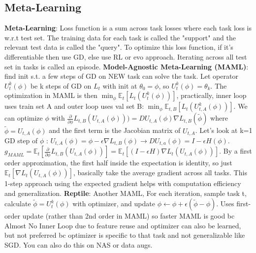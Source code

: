 \subsection*{Meta-Learning}
\textbf{Meta-Learning}: Loss function is a sum across task losses where each task loss is w.r.t test set. The training data for each task is called the "support" and the relevant test data is called the "query". To optimize this loss function, if it's differentiable then use GD, else use RL or evo approach. Iterating across all test set in tasks is called an episode. 
\textbf{Model-Agnostic Meta-Learning (MAML)}: find init s.t. a few steps of GD on NEW task can solve the task. Let operator $U_{t}^{k}(\phi )$ be k steps of GD on $L_{t}$ with init at $\theta_{0} = \phi$, so $U_{t}^{k}(\phi) = \theta_{k}$. The optimization in MAML is then $\min_{\phi} \mathbb{E}_{t}[L_{t}(U_{t}^{k}(\phi))]$, practically, inner loop uses train set A and outer loop uses val set B: $\min_{\phi} \mathbb{E}_{t,B}[L_{t}(U_{t,A}^{k}(\phi))]$. We can optimize $\phi$ with $\frac{\partial }{\partial \phi}L_{t,B}(U_{t,A}(\phi))) = DU_{t,A}(\phi) \nabla L_{t,B}(\tilde \phi)$ where $\tilde \phi = U_{t,A}(\phi)$ and the first term is the Jacobian matrix of $U_{t,A}$. Let's look at k=1 GD step of $\phi$ : $U_{t,A}(\phi) = \phi - \epsilon \nabla L_{t,B}(\phi) \rightarrow DU_{t,a}(\phi) = I - \epsilon H(\phi)$. $g_{MAML} = \mathbb{E}_{t}\left[\frac{\partial}{\partial\phi}L_{t,B}(U_{t,A}(\phi))\right] = \mathbb{E}_{t}\left[(I - \epsilon H)\nabla L_{t}(U_{t,A}(\phi))\right]$. By a first order approximation, the first half inside the expectation is identity, so just $\mathbb{E}_{t}\left[\nabla L_{t}(U_{t,A}(\phi))\right]$, basically take the average gradient across all tasks. This 1-step approach using the expected gradient helps with computation efficiency and generalization. 
\textbf{Reptile}: Another MAML, For each iteration, sample task t, calculate $\tilde \phi = U_{t}^{k}(\phi)$ with optimizer, and update $\phi \leftarrow \phi + \epsilon(\tilde \phi - \phi)$. Uses first-order update (rather than 2nd order in MAML) so faster 
MAML is good bc Almost No Inner Loop due to feature reuse and optimizer can also be learned, but not preferred bc optimizer is specific to that task and not generalizable like SGD. You can also do this on NAS or data augs. 